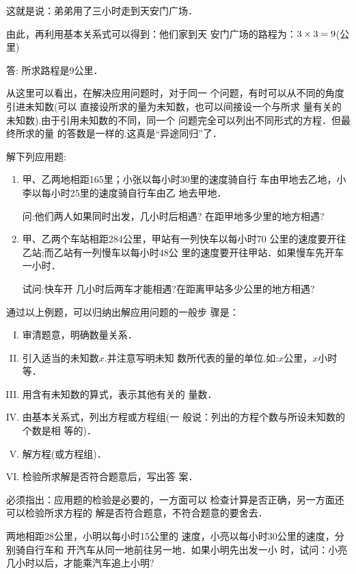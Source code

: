 这就是说：弟弟用了三小时走到天安门广场．

由此，再利用基本关系式可以得到：他们家到天
安门广场的路程为：$3\times3= 9$(公里)
    
答: 所求路程是9公里．

从这里可以看出，在解决应用问题时，对于同一
个问题，有时可以从不同的角度引进未知数(可以
直接设所求的量为未知数，也可以间接设一个与所求
量有关的未知数).由于引用未知数的不同，同一个
问题完全可以列出不同形式的方程．但最终所求的量
的答数是一样的.这真是“异途同归”了．


\begin{ex}
    解下列应用题:
\begin{enumerate}
    \item 甲、乙两地相距165里；小张以每小时30里的速度骑自行
    车由甲地去乙地，小李以每小时25里的速度骑自行车由乙
    地去甲地．
    
    问:他们两人如果同时出发，几小时后相遇?
    在距甲地多少里的地方相遇?
    \item 甲、乙两个车站相距284公里，甲站有一列快车以每小时70
    公里的速度要开往乙站;而乙站有一列慢车以每小时48公
    里的速度要开往甲站．如果慢车先开车一小时．
    
    试问:快车开
    几小时后两车才能相遇?在距离甲站多少公里的地方相遇?
\end{enumerate}
\end{ex}    
    
通过以上例题，可以归纳出解应用问题的一般步
骤是：

\begin{blk}{}
\begin{enumerate}[I. ]
    \item 审清题意，明确数量关系．
    \item 引入适当的未知数$x$.并注意写明未知
    数所代表的量的单位.如:$x$公里，$x$小时等．
    \item 用含有未知数的算式，表示其他有关的
    量数．
    \item 由基本关系式，列出方程或方程组(一
    般说：列出的方程个数与所设未知数的个数是相
    等的)．
    \item 解方程(或方程组)．
    \item 检验所求解是否符合题意后，写出答
    案．
\end{enumerate}
\end{blk}

必须指出：应用题的检验是必要的，一方面可以
检查计算是否正确，另一方面还可以检验所求方程的
解是否符合题意，不符合题意的要舍去．

\begin{example}
    两地相距28公里，小明以每小时15公里的
速度，小亮以每小时30公里的速度，分别骑自行车和
开汽车从同一地前往另一地．如果小明先出发一小
时，试问：小亮几小时以后，才能乘汽车追上小明?
\end{example}

